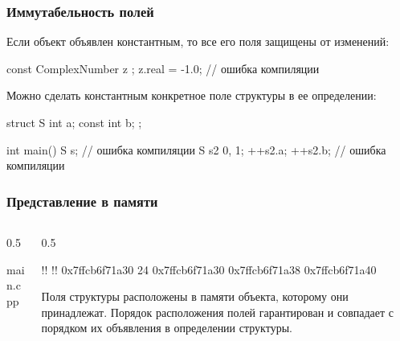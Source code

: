 \documentclass[compress, 8pt, aspectratio=169]{beamer}
\begin{document}
\begin{frame}[fragile]

    \frametitle{Иммутабельность полей}

    \hfill\break
    Если объект объявлен константным, то все его поля защищены от изменений:

    \begin{myinplacelisting}[minted language=cpp]
const ComplexNumber z {};
z.real = -1.0; // ошибка компиляции
    \end{myinplacelisting}

    Можно сделать константным конкретное поле структуры в ее определении:

    \begin{myinplacelisting}[minted language=cpp]
struct S {
    int a;
    const int b;
};

int main() {
    S s; // ошибка компиляции
    S s2 {0, 1};
    ++s2.a;
    ++s2.b; // ошибка компиляции
}
    \end{myinplacelisting}

\end{frame}

\begin{frame}[fragile]

    \frametitle{Представление в памяти}

    \begin{columns}[T]

        \begin{column}{0.5\textwidth}

                {main.cpp}

        \end{column}

        \begin{column}{0.5\textwidth}

            \begin{terminalwindow}
!!
!!
0x7ffcb6f71a30
24
0x7ffcb6f71a30
0x7ffcb6f71a38
0x7ffcb6f71a40
            \end{terminalwindow}

            Поля структуры расположены в памяти объекта, которому они принадлежат.
            Порядок расположения полей гарантирован и совпадает с порядком их
            объявления в определении структуры.

        \end{column}

    \end{columns}

\end{frame}
\end{document}
